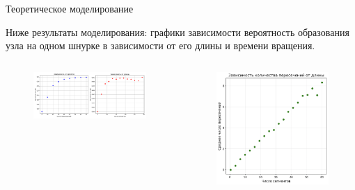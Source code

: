 \begin{frame}{Теоретическое моделирование}

	\begin{block}{}
		Ниже результаты моделирования: графики зависимости вероятность образования узла на одном шнурке в зависимости от его длины и времени вращения.
	\end{block}

	\begin{columns}

		\begin{column}{0.5\linewidth}
			\begin{figure}[H]
				\includegraphics[width=1\linewidth]{img/probability_3.png}
			\end{figure}

		\end{column}

		\begin{column}{0.5\linewidth}
			\begin{figure}[H]
				\includegraphics[width=1\linewidth]{img/probobility_5.png}
			\end{figure}
		\end{column}


\end{columns}
\end{frame}

